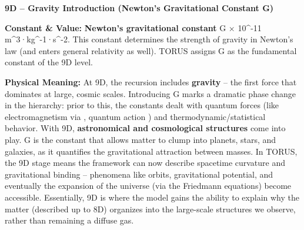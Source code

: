\documentclass[
]{article}
\begin{document}
\textbf{9D -- Gravity Introduction (Newton's Gravitational Constant G)}

\textbf{Constant \& Value:} \textbf{Newton's gravitational constant} G  × 10\^{}-11 m\^{}3·kg\^{}-1·s\^{}-2\hspace{0pt}. This constant
determines the strength of gravity in Newton's law (and enters general
relativity as well). TORUS assigns G as the fundamental constant of the
9D level.

\textbf{Physical Meaning:} At 9D, the recursion includes
\textbf{gravity} -- the first force that dominates at large, cosmic
scales. Introducing G marks a dramatic phase change in the hierarchy:
prior to this, the constants dealt with quantum forces (like
electromagnetism via \alpha, quantum action \hbar) and thermodynamic/statistical
behavior. With 9D, \textbf{astronomical and cosmological structures}
come into play\hspace{0pt}. G is the constant that allows matter to
clump into planets, stars, and galaxies, as it quantifies the
gravitational attraction between masses. In TORUS, the 9D stage means
the framework can now describe spacetime curvature and gravitational
binding -- phenomena like orbits, gravitational potential, and
eventually the expansion of the universe (via the Friedmann equations)
become accessible. Essentially, 9D is where the model gains the ability
to explain why the matter (described up to 8D) organizes into the
large-scale structures we observe, rather than remaining a diffuse gas.
\end{document}
